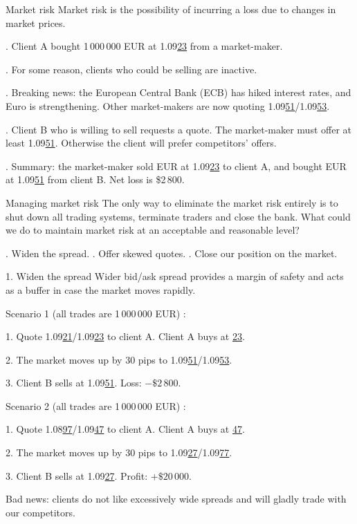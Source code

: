 \documentclass{beamer}
\begin{document}
\begin{frame}{Market risk}
\justify
\alert{Market risk} is the possibility of incurring a loss due to changes in market prices.

. Client A bought 1\,000\,000 EUR at 1.09\underline{23} from a market-maker.

. For some reason, clients who could be selling are inactive.

. Breaking news: the European Central Bank (ECB) has hiked interest rates, and Euro is strengthening. Other market-makers are now quoting 1.09\underline{51}/1.09\underline{53}.

. Client B who is willing to sell requests a quote. The market-maker must offer at least 1.09\underline{51}. Otherwise the client will prefer competitors' offers.

. Summary: the market-maker sold EUR at 1.09\underline{23} to client A, and bought EUR at 1.09\underline{51} from client B. Net loss is \$2\,800.
\end{frame}



\begin{frame}{Managing market risk}
\justify
The only way to eliminate the market risk entirely is to shut down all trading systems, terminate traders and close the bank. What could we do to maintain market risk at an acceptable and reasonable level?

. Widen the spread.
. Offer skewed quotes.
. Close our position on the market.
\end{frame}



\begin{frame}{1. Widen the spread}
\justify
Wider bid/ask spread provides a margin of safety and acts as a buffer in case the market moves
rapidly.

\justify
Scenario 1 (all trades are 1\,000\,000 EUR) :

1. Quote 1.09\underline{21}/1.09\underline{23} to client A. Client A buys at \underline{23}.

2. The market moves up by 30 pips to 1.09\underline{51}/1.09\underline{53}.

3. Client B sells at 1.09\underline{51}. Loss: $-\$2\,800$.

\justify
Scenario 2 (all trades are 1\,000\,000 EUR) :

1. Quote 1.08\underline{97}/1.09\underline{47} to client A. Client A buys at \underline{47}.

2. The market moves up by 30 pips to 1.09\underline{27}/1.09\underline{77}.

3. Client B sells at 1.09\underline{27}. Profit: $+\$20\,000$.

\justify
Bad news: clients do not like excessively wide spreads and will gladly trade with our competitors.
\end{frame}
\end{document}
